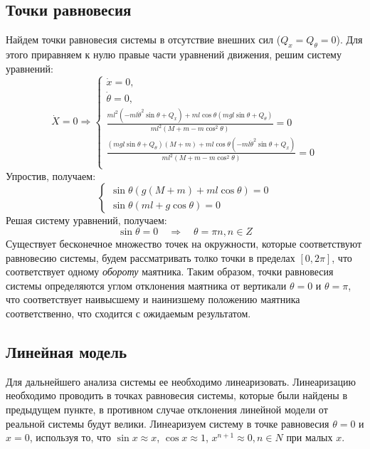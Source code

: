 \subsection{Точки равновесия}
Найдем точки равновесия системы в отсутствие внешних сил ($Q_x = Q_{\theta} = 0$). 
Для этого приравняем к нулю правые части уравнений движения, решим систему уравнений:
\begin{equation}
    \dot{X} = 0 \Rightarrow 
    \begin{cases}
        \dot{x} = 0, \\
        \dot{\theta} = 0, \\
        \frac{ml^2(-ml\dot{\theta}^2\sin\theta + Q_x) + ml\cos\theta(mgl\sin\theta + Q_{\theta}) }{ml^2(M + m - m\cos^2\theta)} = 0 \\
        \frac{(mgl\sin\theta + Q_{\theta})(M + m) + ml\cos\theta(-ml\dot{\theta}^2\sin\theta + Q_x) }{ml^2(M + m - m\cos^2\theta)}  = 0 \\ 
    \end{cases}
\end{equation}
Упростив, получаем: 
\begin{equation}
    \begin{cases}
        \sin\theta(g(M + m) + ml\cos\theta) = 0 \\ 
        \sin\theta(ml + g\cos\theta) = 0
    \end{cases}
\end{equation}
Решая систему уравнений, получаем:
\begin{equation}
    \sin\theta = 0 \quad\Rightarrow\quad \theta = \pi n, n \in Z
\end{equation}
Существует бесконечное множество точек на окружности, которые соответствуют равновесию системы, будем рассматривать толко 
точки в пределах $[0, 2\pi]$, что соответствует одному \textit{обороту} маятника.
Таким образом, точки равновесия системы определяются углом отклонения маятника от вертикали $\theta = 0$ и $\theta = \pi$, 
что соответствует наивысшему и наинизшему положению маятника соответственно, что сходится с ожидаемым результатом. 

\subsection{Линейная модель}
Для дальнейшего анализа системы ее необходимо линеаризовать. Линеаризацию необходимо проводить в точках равновесия 
системы, которые были найдены в предыдущем пункте, в противном случае отклонения линейной модели от реальной системы будут велики. 
Линеаризуем систему в точке равновесия $\theta = 0$ и $x = 0$, используя то, что $\sin x \approx x$, $\cos x \approx 1$, $x^{n + 1} \approx 0, n \in N$ 
при малых $x$. 

